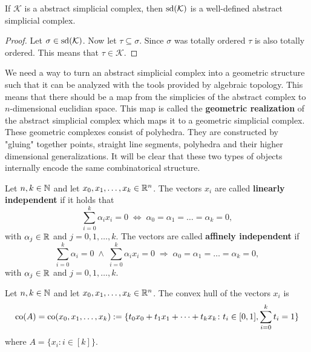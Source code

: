 \begin{thm}
    If $\mathcal{K}$ is a abstract simplicial complex, then ${\rm sd}(\mathcal{K})$ is a well-defined abstract simplicial complex.
\end{thm}

\begin{proof}
    Let $\sigma \in {\rm sd}(\mathcal{K})$. Now let $\tau \subseteq \sigma$. Since $\sigma$ was totally ordered $\tau$ is also totally ordered.
    This means that $\tau \in \mathcal{K}$.
\end{proof}

We need a way to turn an abstract simplicial complex into a geometric structure such that it can be analyzed with the tools provided by algebraic topology. This means that there should be a map from the simplicies of the abstract complex to $n$-dimensional euclidian space. This map is called the \textbf{geometric realization} of the abstract simplicial complex which maps it to a geometric simplicial complex. 
These geometric complexes consist of polyhedra. They are constructed by "gluing" 
together points, straight line segments, polyhedra and their higher dimensional generalizations.
It will be clear that these two types of objects internally encode the same combinatorical structure. 

\begin{defin}
    Let $n,k \in \mathbb{N}$ and let $x_0, x_1, \ldots, x_k \in \mathbb{R}^n$. The vectors $x_i$ are called \textbf{linearly independent} if it holds that 
    \begin{equation*}
        \sum\limits_{i=0}^k \alpha_i x_i = 0 \; \iff \; \alpha_0 = \alpha_1 = \ldots = \alpha_k = 0,
    \end{equation*} with $\alpha_j \in \mathbb{R}$ and $j = 0, 1, \ldots, k$.
    The vectors are called \textbf{affinely independent} if
    \begin{equation*}
        \sum\limits_{i=0}^k \alpha_i = 0 \; \land \; \sum\limits_{i=0}^k \alpha_i x_i = 0 \; \Rightarrow \; \alpha_0 = \alpha_1 = \ldots = \alpha_k = 0, 
    \end{equation*} with $\alpha_j \in \mathbb{R}$ and $j = 0, 1, \ldots, k$.
\end{defin}

\begin{defin}
    Let $n,k \in \mathbb{N}$ and let $x_0, x_1, \ldots, x_k \in \mathbb{R}^n$. The convex hull of the vectors $x_i$ is
    \begin{equation*}
        {\rm co} (A) = {\rm co}(x_0, x_1, \ldots, x_k) := \{ t_0 x_0 + t_1 x_1 + \cdots + t_k x_k \colon t_i \in [0, 1], \sum\limits_{i=0}^k t_i = 1\}
    \end{equation*}
    where $A = \{x_i\colon i \in [k]\}$.  
\end{defin}

